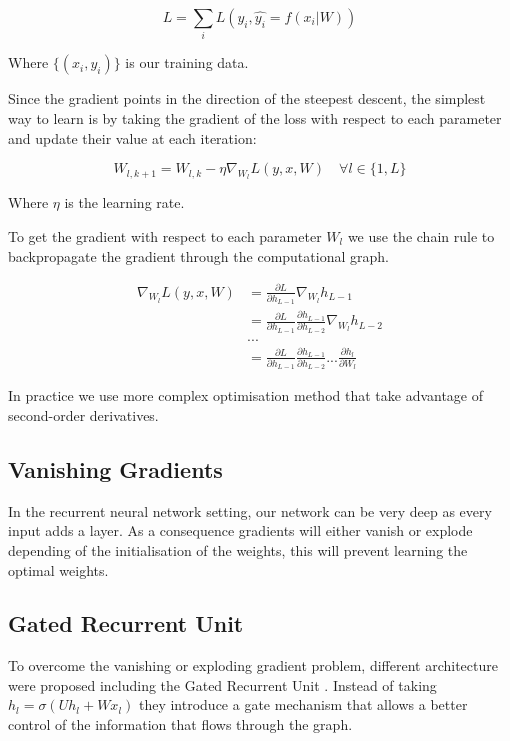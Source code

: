 \documentclass[10pt,oneside,openright]{report}
\begin{document}
$$L = \sum_i L(y_i, \hat{y_i} = f(x_i|W))$$

Where $\{(x_i, y_i)\}$ is our training data. 

Since the gradient points in the direction of the steepest descent, the simplest way to learn is by taking the gradient of the loss with respect to each parameter and update their value at each iteration:

$$ W_{l, k+1} = W_{l, k} - \eta \nabla_{W_l} L(y, x, W) \quad \forall l \in \{1, L\}$$

Where $\eta$ is the learning rate.
 
To get the gradient with respect to each parameter $W_l$ we use the chain rule to backpropagate the gradient through the computational graph.
 
 \begin{align}
   \nabla_{W_l} L(y, x, W) &= \frac{\partial L}{\partial h_{L-1}} \nabla_{W_l} h_{L-1}\\
   &= \frac{\partial L}{\partial h_{L-1}} \frac{\partial h_{L-1}}{\partial h_{L-2}} \nabla_{W_l} h_{L-2}\\
   &...\\
   &= \frac{\partial L}{\partial h_{L-1}} \frac{\partial h_{L-1}}{\partial h_{L-2}} ... \frac{\partial h_l}{\partial W_l}
 \end{align}
 
In practice we use more complex optimisation method that take advantage of second-order derivatives. 
 
\subsection{Vanishing Gradients}
In the recurrent neural network setting, our network can be very deep as every input adds a layer. As a consequence gradients will either vanish or explode depending of the initialisation of the weights, this will prevent learning the optimal weights.

\subsection{Gated Recurrent Unit}
To overcome the vanishing or exploding gradient problem, different architecture were proposed including the Gated Recurrent Unit \cite{gru}. Instead of taking $h_l = \sigma(U h_l + W x_l)$ they introduce a gate mechanism that allows a better control of the information that flows through the graph.
\end{document}
